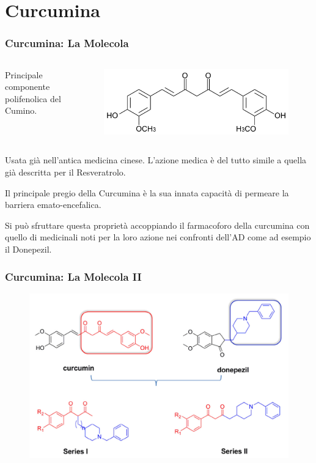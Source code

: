 \documentclass[9pt]{beamer}
\begin{document}
\section{Curcumina}

\begin{frame}
	\frametitle{Curcumina: La Molecola}
	\begin{columns}
		\begin{column}{.4\textwidth}
			Principale componente polifenolica del Cumino.
		\end{column}
		\begin{column}{.6\textwidth}
			\begin{figure}
				\includegraphics[width=.8\textwidth]{immagini/curcumina.png}
			\end{figure}
		\end{column}
	\end{columns}
	\bigskip
	
	Usata già nell'antica medicina cinese. L'azione medica è del tutto simile a quella già descritta per il Resveratrolo.
	
	Il principale pregio della Curcumina è la sua innata capacità di permeare la barriera emato-encefalica.
	
	Si può sfruttare questa proprietà accoppiando il farmacoforo della curcumina con quello di medicinali noti per la loro azione nei confronti dell'AD come ad esempio il Donepezil.
\end{frame}

\begin{frame}
	\frametitle{Curcumina: La Molecola II}
	\begin{figure}
		\includegraphics[scale=0.9]{immagini/generale_curcdone.png}
	\end{figure}
\end{frame}
\end{document}
